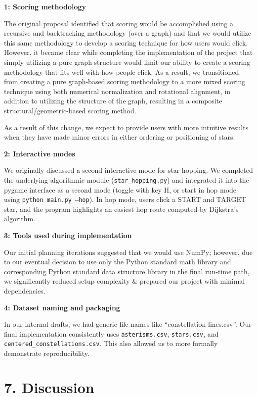 \documentclass[11pt]{article}
\begin{document}
\textbf{1: Scoring methodology}

The original proposal identified that scoring would be accomplished using a recursive and backtracking methodology (over a graph) and that we would utilize this same methodology to develop a scoring technique for how users would click. However, it became clear while completing the implementation of the project that simply utilizing a pure graph structure would limit our ability to create a scoring methodology that fits well with how people click. As a result, we transitioned from creating a pure graph-based scoring methodology to a more mixed scoring technique using both numerical normalization and rotational alignment, in addition to utilizing the structure of the graph, resulting in a composite structural/geometric-based scoring method. 

As a result of this change, we expect to provide users with more intuitive results when they have made minor errors in either ordering or positioning of stars.

\textbf{2: Interactive modes}

We originally discussed a second interactive mode for star hopping. We completed the underlying algorithmic module (\texttt{star\_hopping.py}) and integrated it into the pygame interface as a second mode (toggle with key H, or start in hop mode using \texttt{python main.py --hop}). In hop mode, users click a START and TARGET star, and the program highlights an easiest hop route computed by Dijkstra's algorithm.

\textbf{3: Tools used during implementation}

Our initial planning iterations suggested that we would use NumPy; however, due to our eventual decision to use only the Python standard math library and corresponding Python standard data structure library in the final run-time path, we significantly reduced setup complexity \& prepared our project with minimal dependencies.

\textbf{4: Dataset naming and packaging}

In our internal drafts, we had generic file names like ``constellation lines.csv''. Our final implementation consistently uses \texttt{asterisms.csv}, \texttt{stars.csv}, and \texttt{centered\_constellations.csv}. This also allowed us to more formally demonstrate reproducibility.

\section*{7. Discussion}
\end{document}
